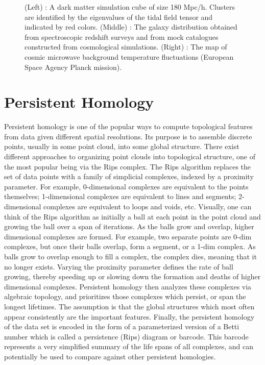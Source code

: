 \documentclass[12pt]{article}
\begin{document}
\begin{figure}[!htb]
\endminipage\hfill
\caption{(Left) : A dark matter simulation cube of size 180 Mpc/h. Clusters are identified by the eigenvalues of the tidal field tensor and indicated by red colors. (Middle) : The galaxy distribution obtained from spectroscopic redshift surveys and from mock catalogues constructed from cosmological simulations. (Right) : The map of cosmic microwave background temperature fluctuations (European Space Agency Planck mission). }
\end{figure}

\section{Persistent Homology}
Persistent homology is one of the popular ways to compute topological features from data given different spatial resolutions. Its purpose is to assemble discrete points, usually in some point cloud, into some global structure. There exist different approaches to organizing point clouds into topological structure, one of the most popular being via the Rips complex. The Rips algorithm replaces the set of data points with a family of simplicial complexes, indexed by a proximity parameter. For example, 0-dimensional complexes are equivalent to the points themselves; 1-dimensional complexes are equivalent to lines and segments; 2-dimensional complexes are equivalent to loops and voids, etc. Visually, one can think of the Rips algorithm as initially a ball at each point in the point cloud and growing the ball over a span of iterations. As the balls grow and overlap, higher dimensional complexes are formed. For example, two separate points are 0-dim complexes, but once their balls overlap, form a segment, or a 1-dim complex. As balls grow to overlap enough to fill a complex, the complex dies, meaning that it no longer exists. Varying the proximity parameter defines the rate of ball growing, thereby speeding up or slowing down the formation and deaths of higher dimensional complexes. Persistent homology then analyzes these complexes via algebraic topology, and prioritizes those complexes which persist, or span the longest lifetimes. The assumption is that the global structures which most often appear consistently are the important features. Finally, the persistent homology of the data set is encoded in the form of a parameterized version of a Betti number which is called a persistence (Rips) diagram or barcode. This barcode represents a very simplified summary of the life spans of all complexes, and can potentially be used to compare against other persistent homologies.
\end{document}
